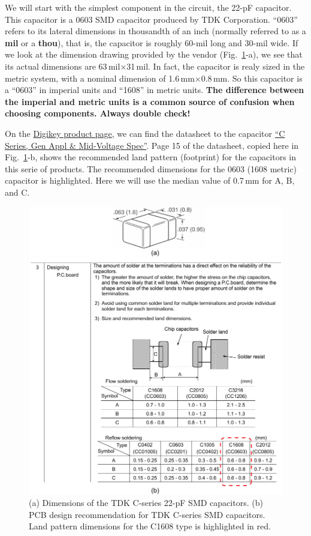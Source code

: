 \documentclass[12pt,letterpaper]{scrartcl}
\begin{document}
We will start with the simplest component in the circuit, the 22-pF capacitor. This capacitor is a 0603 SMD capacitor produced by TDK Corporation. ``0603'' refers to its lateral dimensions in thousandth of an inch (normally referred to as a \textbf{mil} or a \textbf{thou}), that is, the capacitor is roughly 60-mil long and 30-mil wide. If we look at the dimension drawing provided by the vendor (Fig.~\ref{fig:tdk_cap_datasheet}-a), we see that its actual dimensions are 63\,mil$\times$31\,mil. In fact, the capacitor is realy sized in the metric system, with a nominal dimension of 1.6\,mm$\times$0.8\,mm. So this capacitor is a ``0603'' in imperial units and ``1608'' in metric units. \textbf{The difference between the imperial and metric units is a common source of confusion when choosing components. Always double check!}

On the \href{http://www.digikey.com/product-detail/en/C1608C0G1H220J080AA/445-1273-1-ND/567670}{Digikey product page}, we can find the datasheet to the capacitor \href{http://product.tdk.com/en/catalog/spec/mlccspec_commercial_general_midvoltage_en.pdf}{``C Series, Gen Appl \& Mid-Voltage Spec''}. Page 15 of the datasheet, copied here in Fig.~\ref{fig:tdk_cap_datasheet}-b, shows the recommended land pattern (footprint) for the capacitors in this serie of products. The recommended dimensions for the 0603 (1608 metric) capacitor is highlighted. Here we will use the median value of 0.7\,mm for A, B, and C. 

	\begin{figure}[hp]
		\centering
		\includegraphics{tdk_cap_datasheet}
		\caption{(a) Dimensions of the TDK C-series 22-pF SMD capacitors. (b) PCB design recommendation for TDK C-series SMD capacitors. Land pattern dimensions for the C1608 type is highlighted in red.}
		\label{fig:tdk_cap_datasheet}
	\end{figure}
\end{document}
